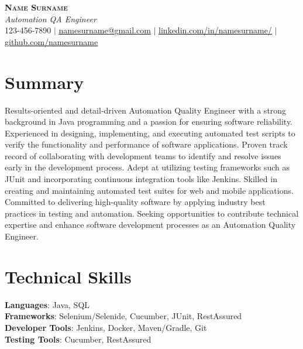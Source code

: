 \documentclass[letterpaper,11pt]{article}
\begin{document}

\begin{center}
    \textbf{\Huge \scshape Name Surname} \\ \vspace{1pt}
    \small \textit{Automation QA Engineer} \\
    123-456-7890 $|$ \href{mailto:namesurname@gmail.com}{\underline{namesurname@gmail.com}} $|$ 
    \href{https://www.linkedin.com/in/namesurname/}{\underline{linkedin.com/in/namesurname/}} $|$
    \href{https://github.com/namesurname}{\underline{github.com/namesurname}}
\end{center}

\section*{Summary}
Results-oriented and detail-driven Automation Quality Engineer with a strong background in Java programming and a passion for ensuring software reliability. Experienced in designing, implementing, and executing automated test scripts to verify the functionality and performance of software applications. Proven track record of collaborating with development teams to identify and resolve issues early in the development process. Adept at utilizing testing frameworks such as JUnit and incorporating continuous integration tools like Jenkins. Skilled in creating and maintaining automated test suites for web and mobile applications. Committed to delivering high-quality software by applying industry best practices in testing and automation. Seeking opportunities to contribute technical expertise and enhance software development processes as an Automation Quality Engineer.

\section{Technical Skills}
 \begin{itemize}[leftmargin=0.15in, label={}]
    \small{\item{
     \textbf{Languages}{: Java, SQL} \\
     \textbf{Frameworks}{: Selenium/Selenide, Cucumber, JUnit, RestAssured} \\
     \textbf{Developer Tools}{: Jenkins, Docker, Maven/Gradle, Git} \\
     \textbf{Testing Tools}{: Cucumber, RestAssured}
    }}
 \end{itemize}
\end{document}

